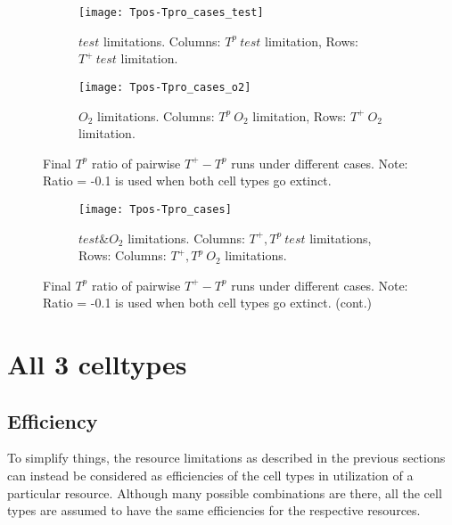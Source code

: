 \begin{figure}[h!]
  \centering
  \begin{subfigure}[b]{\textwidth}
    \centering
    \texttt{[image: Tpos-Tpro\_cases\_test]}
    \caption{$test$ limitations. Columns: $T^p\ test$ limitation, Rows: $T^+\ test$ limitation.}
    \label{fig_Tpos-Tpro_cases_test}
  \end{subfigure}
  \begin{subfigure}[b]{\textwidth}
    \centering
    \texttt{[image: Tpos-Tpro\_cases\_o2]}
    \caption{$O_2$ limitations. Columns: $T^p\ O_2$ limitation, Rows: $T^+\ O_2$ limitation.}
    \label{fig_Tpos-Tpro_cases_o2}
  \end{subfigure}
  \caption[Final $T^p$ ratio of pairwise $T^+ - T^p$ runs under different cases]{Final $T^p$ ratio of pairwise $T^+ - T^p$ runs under different cases. Note: Ratio = -0.1 is used when both cell types go extinct.}
\end{figure}
\begin{figure}[h!]\ContinuedFloat
  \begin{subfigure}[b]{\textwidth}
    \centering
    \texttt{[image: Tpos-Tpro\_cases]}
    \caption{$test \& O_2$ limitations. Columns: $T^+,T^p\ test$ limitations, Rows: Columns: $T^+,T^p\ O_2$ limitations.}
    \label{fig_Tpos-Tpro_cases_combi}
  \end{subfigure}
  \caption[]{Final $T^p$ ratio of pairwise $T^+ - T^p$ runs under different cases. Note: Ratio = -0.1 is used when both cell types go extinct. (cont.)}
  \label{fig_Tpos-Tpro_cases}
\end{figure}

\newpage

\section{All 3 celltypes}
\subsection{Efficiency}
To simplify things, the resource limitations as described in the previous sections can instead be considered as efficiencies of the cell types in utilization of a particular resource.
Although many possible combinations are there, all the cell types are assumed to have the same efficiencies for the respective resources.

